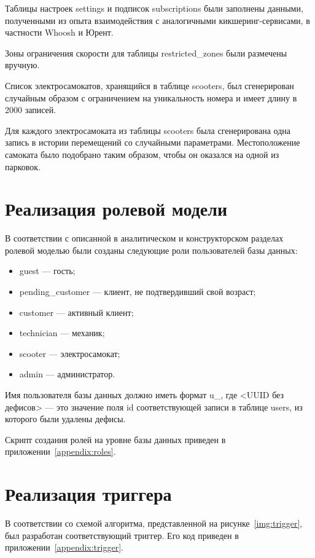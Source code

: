 Таблицы настроек settings и подписок subscriptions были заполнены данными, полученными из опыта взаимодействия с аналогичными кикшеринг-сервисами, в частности Whoosh и Юрент.

Зоны ограничения скорости для таблицы restricted\_zones были размечены вручную.

Список электросамокатов, хранящийся в таблице scooters, был сгенерирован случайным образом с ограничением на уникальность номера и имеет длину в 2000 записей.

Для каждого электросамоката из таблицы scooters была сгенерирована одна запись в истории перемещений со случайными параметрами. Местоположение самоката было подобрано таким образом, чтобы он оказался на одной из парковок.

\section{Реализация ролевой модели}

В соответствии с описанной в аналитическом и конструкторском разделах ролевой моделью были созданы следующие роли пользователей базы данных:

\begin{itemize}
    \item guest --- гость;
    \item pending\_customer --- клиент, не подтвердивший свой возраст;
    \item customer --- активный клиент;
    \item technician --- механик;
    \item scooter --- электросамокат;
    \item admin --- администратор.
\end{itemize}

Имя пользователя базы данных должно иметь формат u\_<UUID без дефисов>, где <UUID без дефисов> --- это значение поля id соответствующей записи в таблице users, из которого были удалены дефисы.

Скрипт создания ролей на уровне базы данных приведен в приложении~\ref{appendix:roles}.

\section{Реализация триггера}

В соответствии со схемой алгоритма, представленной на рисунке~\ref{img:trigger}, был разработан соответствующий триггер. Его код приведен в приложении~\ref{appendix:trigger}.

